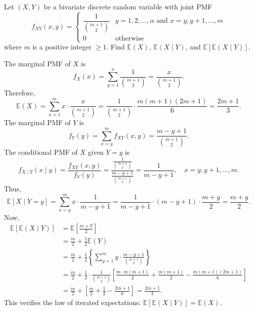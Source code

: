 \begin{example}
    Let $(X, Y)$ be a bivariate discrete random variable with joint PMF
    \[
        f_{XY}(x,y) = \begin{cases}
            \dfrac{1}{\binom{m+1}{2}} & y = 1, 2, \ldots, \alpha \text{ and } x = y, y+1, \ldots, m\\[6pt]
            0 & \text{otherwise}
        \end{cases}
    \]
    where $m$ is a positive integer $\geq 1$. Find $\mathbb{E}(X)$, $\mathbb{E}(X \mid Y)$, and $\mathbb{E}[\mathbb{E}(X \mid Y)]$.
\end{example}
\begin{solution}
    The marginal PMF of $X$ is
    \[
        f_X(x) = \sum_{y=1}^{x} \frac{1}{\binom{m+1}{2}} = \frac{x}{\binom{m+1}{2}}.
    \]
    Therefore,
    \[
        \mathbb{E}(X) = \sum_{x=1}^{m} x \cdot \frac{x}{\binom{m+1}{2}} = \frac{1}{\binom{m+1}{2}} \cdot \frac{m(m+1)(2m+1)}{6} = \frac{2m+1}{3}.
    \]
    The marginal PMF of $Y$ is
    \[
        f_Y(y) = \sum_{x=y}^{m} f_{XY}(x,y) = \frac{m-y+1}{\binom{m+1}{2}}.
    \]
    The conditional PMF of $X$ given $Y = y$ is
    \[
        f_{X \mid Y}(x \mid y) = \frac{f_{XY}(x,y)}{f_Y(y)} = \frac{\frac{1}{\binom{m+1}{2}}}{\frac{m-y+1}{\binom{m+1}{2}}} = \frac{1}{m-y+1}, \quad x = y, y+1, \ldots, m.
    \]
    Thus,
    \[
        \mathbb{E}[X \mid Y = y] = \sum_{x=y}^{m} x \cdot \frac{1}{m-y+1} = \frac{1}{m-y+1} \cdot (m-y+1) \cdot \frac{m+y}{2} = \frac{m+y}{2}.
    \]
    Now,
    \begin{align*}
        \mathbb{E}[\mathbb{E}(X \mid Y)] &= \mathbb{E}\left[ \frac{m+Y}{2} \right]\\
        &= \frac{m}{2} + \frac{1}{2} \mathbb{E}(Y)\\
        &= \frac{m}{2} + \frac{1}{2} \left\{ \sum_{y=1}^{m} y \cdot \frac{m-y+1}{\binom{m+1}{2}} \right\}\\
        &= \frac{m}{2} + \frac{1}{2} \cdot \frac{1}{\binom{m+1}{2}} \left[ \frac{m \cdot m(m+1)}{2} + \frac{m(m+1)}{2} - \frac{m(m+1)(2m+1)}{6} \right]\\
        &= \frac{m}{2} + \left[ \frac{m}{2} + \frac{1}{2} - \frac{2m+1}{6} \right] = \frac{2m+1}{3}.
    \end{align*}
    This verifies the law of iterated expectations: $\mathbb{E}[\mathbb{E}(X \mid Y)] = \mathbb{E}(X)$.
\end{solution}

